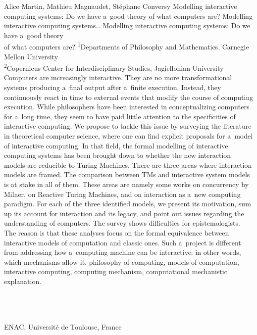 \begin{artengenv2auth}{Alice Martin, Mathieu Magnaudet, Stéphane Conversy}
	{Modelling interactive computing systems: Do we have a~good theory of what computers are?}
	{Modelling interactive computing systems\ldots}
	{Modelling interactive computing systems: Do we have a~good theory\\of what computers are?}
	{\textsuperscript{1}Departments of Philosophy and Mathematics, Carnegie Mellon University\\
		\textsuperscript{2}Copernicus Center for Interdisciplinary Studies, Jagiellonian University}
	{Computers are increasingly interactive. They are no more transformational systems producing a~final output after a~finite execution. Instead, they continuously react in time to external events that modify the course of computing execution. While philosophers have been interested in conceptualizing computers for a~long time, they seem to have paid little attention to the specificities of interactive computing. We propose to tackle this issue by surveying the literature in theoretical computer science, where one can find explicit proposals for a~model of interactive computing. 
	In that field, the formal modelling of interactive computing systems has been brought down to whether the new interaction models are reducible to Turing Machines. There are three areas where interaction models are framed. The comparison between TMs and interactive system models is at stake in all of them. These areas are namely some works on concurrency by Milner, on Reactive Turing Machines, and on interaction as a~new computing paradigm. For each of the three identified models, we present its motivation, sum up its account for interaction and its legacy, and point out issues regarding the understanding of computers. The survey shows difficulties for epistemologists. The reason is that these analyses focus on the formal equivalence between interactive models of computation and classic ones. Such a~project is different from addressing how a~computing machine can be interactive: in other words, which mechanisms allow it.}
	{philosophy of computing, models of computation, interactive computing, computing mechanism, computational mechanistic explanation.}
	{%
				{\flushright{}\\\\\\
				\subsubsectit\small{ENAC, Université de Toulouse, France}\par}%
	}


\end{artengenv2auth}
